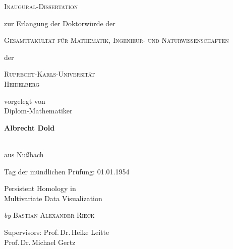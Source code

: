 
\begin{titlepage}
	\begin{center}
		\textsc{\huge Inaugural-Dissertation}
                \vskip 1cm
                \begin{large}
                  zur Erlangung der Doktorwürde der\\[0.50cm]
                  \begin{Large}
                    \textsc{Gesamtfakultät für Mathematik, Ingenieur- und Naturwissenschaften}\\[0.50cm]
                  \end{Large}
                  der\\[0.50cm]
                  \begin{Large}
                    \textsc{Ruprecht-Karls-Universität\\Heidelberg}\par
                  \end{Large}
                \end{large}
		\vfill
		\begin{large}
                  vorgelegt von\\
                  Diplom-Mathematiker\\[0.5cm]
                  \begin{LARGE}
                    \textbf{Albrecht Dold}
                  \end{LARGE}\\[0.5cm]
                  aus Nu{\ss}bach
		\end{large}
    \vskip 1cm
    \begin{small}
      Tag der mündlichen Prüfung: 01.01.1954
    \end{small}
	\end{center}
\end{titlepage}


\begin{titlepage}
  \phantom{}
  \vfill 
  \begin{center}
    \begin{singlespace*}
      \begin{Huge}
          Persistent Homology in\\
          Multivariate Data Visualization\par
      \end{Huge}
      \vskip 0.25cm
      \emph{by}
      \vskip 0.25cm
      \textsc{Bastian Alexander Rieck}\par
    \end{singlespace*}
  \end{center}
  \vfill
  \begin{singlespace*}
    Supervisors:            Prof.\,Dr.\,Heike Leitte\\
    \phantom{Supervisors:}  Prof.\,Dr.\,Michael Gertz
  \end{singlespace*}
\end{titlepage}

\newpage
\null
\thispagestyle{empty}
\newpage

